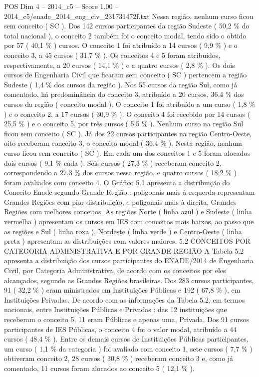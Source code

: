 \begin{textsample}{POS Dim 4 – 2014\_c5 – Score 1.00 – 2014\_c5/enade\_2014\_eng\_civ\_231731472f.txt}
Nessa região, nenhum curso ficou sem conceito ( SC ).
Dos 142 cursos participantes da região Sudeste ( 50,2 \% do total nacional ), o conceito 2 também foi o conceito modal, tendo sido o obtido por 57 ( 40,1 \% ) cursos.
O conceito 1 foi atribuído a 14 cursos ( 9,9 \% ) e o conceito 3, a 45 cursos ( 31,7 \% ).
Os conceitos 4 e 5 foram atribuídos, respectivamente, a 20 cursos ( 14,1 \% ) e a quatro cursos ( 2,8 \% ).
Os dois cursos de Engenharia Civil que ficaram sem conceito ( SC ) pertencem a região Sudeste ( 1,4 \% dos cursos da região ).
Nos 55 cursos da região Sul, como já comentado, há predominância do conceito 3, atribuído a 20 cursos, 36,4 \% dos cursos da região ( conceito modal ).
O conceito 1 foi atribuído a um curso ( 1,8 \% ) e o conceito 2, a 17 cursos ( 30,9 \% ).
O conceito 4 foi recebido por 14 cursos ( 25,5 \% ) e o conceito 5, por três cursos ( 5,5 \% ).
Nenhum curso na região Sul ficou sem conceito ( SC ).
Já dos 22 cursos participantes na região Centro-Oeste, oito receberam conceito 3, o conceito modal ( 36,4 \% ).
Nesta região, nenhum curso ficou sem conceito ( SC ).
Em cada um dos conceitos 1 e 5 foram alocados dois cursos ( 9,1 \% cada ).
Seis cursos ( 27,3 \% ) receberam conceito 2, correspondendo a 27,3 \% dos cursos nessa região, e quatro cursos ( 18,2 \% ) foram avaliados com conceito 4.
O Gráfico 5.1 apresenta a distribuição do Conceito Enade segundo Grande Região : poligonais mais à esquerda representam Grandes Regiões com pior distribuição, e poligonais mais à direita, Grandes Regiões com melhores conceitos.
As regiões Norte ( linha azul ) e Sudeste ( linha vermelha ) apresentam os cursos em IES com conceitos mais baixos, ao passo que as regiões e Sul ( linha roxa ), Nordeste ( linha verde ) e Centro-Oeste ( linha preta ) apresentam as distribuições com valores maiores. 5.2 CONCEITOS POR CATEGORIA ADMINISTRATIVA E POR GRANDE REGIÃO A Tabela 5.2 apresenta a distribuição dos cursos participantes do ENADE/2014 de Engenharia Civil, por Categoria Administrativa, de acordo com os conceitos por eles alcançados, segundo as Grandes Regiões brasileiras.
Dos 283 cursos participantes, 91 ( 32,2 \% ) eram ministrados em Instituições Públicas e 192 ( 67,8 \% ), em Instituições Privadas.
De acordo com as informações da Tabela 5.2, em termos nacionais, entre Instituições Públicas e Privadas : das 12 instituições que receberam o conceito 5, 11 eram Públicas e apenas uma, Privada.
Dos 91 cursos participantes de IES Públicas, o conceito 4 foi o valor modal, atribuído a 44 cursos ( 48,4 \% ).
Entre os demais cursos de Instituições Públicas participantes, um curso ( 1,1 \% da categoria ) foi avaliado com conceito 1, sete cursos ( 7,7 \% ) obtiveram conceito 2, 28 cursos ( 30,8 \% ) receberam conceito 3 e, como já comentado, 11 cursos foram alocados ao conceito 5 ( 12,1 \% ).

\end{textsample}
